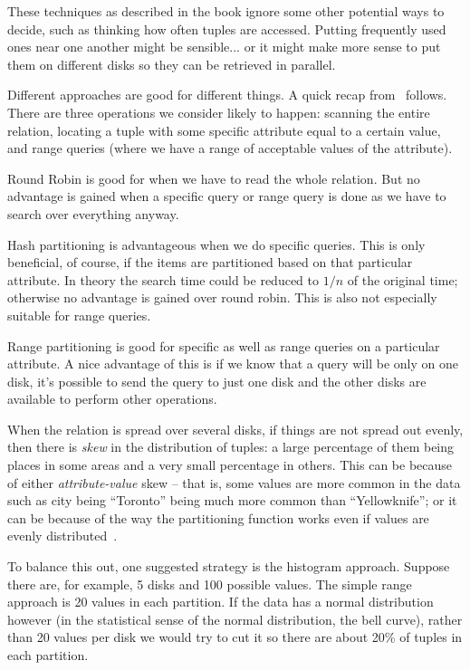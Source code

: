 These techniques as described in the book ignore some other potential ways to decide, such as thinking how often tuples are accessed. Putting frequently used ones near one another might be sensible... or it might make more sense to put them on different disks so they can be retrieved in parallel.

Different approaches are good for different things. A quick recap from~\cite{dsc} follows. There are three operations we consider likely to happen: scanning the entire relation, locating a tuple with some specific attribute equal to a certain value, and range queries (where we have a range of acceptable values of the attribute).

Round Robin is good for when we have to read the whole relation. But no advantage is gained when a specific query or range query is done as we have to search over everything anyway.

Hash partitioning is advantageous when we do specific queries. This is only beneficial, of course, if the items are partitioned based on that particular attribute. In theory the search time could be reduced to $1/n$ of the original time; otherwise no advantage is gained over round robin. This is also not especially suitable for range queries.

Range partitioning is good for specific as well as range queries on a particular attribute. A nice advantage of this is if we know that a query will be only on one disk, it's possible to send the query to just one disk and the other disks are available to perform other operations.

When the relation is spread over several disks, if things are not spread out evenly, then there is \textit{skew} in the distribution of tuples: a large percentage of them being places in some areas and a very small percentage in others. This can be because of either \textit{attribute-value} skew -- that is, some values are more common in the data such as city being ``Toronto'' being much more common than ``Yellowknife''; or it can be because of the way the partitioning function works even if values are evenly distributed~\cite{dsc}.

To balance this out, one suggested strategy is the histogram approach. Suppose there are, for example, 5 disks and 100 possible values. The simple range approach is 20 values in each partition. If the data has a normal distribution however (in the statistical sense of the normal distribution, the bell curve), rather than 20 values per disk we would try to cut it so there are about 20\% of tuples in each partition.

